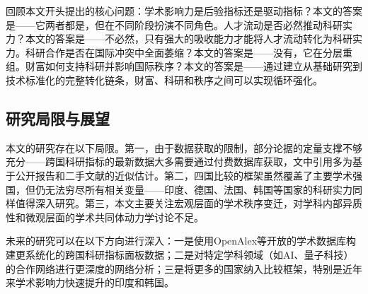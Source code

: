回顾本文开头提出的核心问题：学术影响力是后验指标还是驱动指标？本文的答案是——它两者都是，但在不同阶段扮演不同角色。人才流动是否必然推动科研实力？本文的答案是——不必然，只有强大的吸收能力才能将人才流动转化为科研实力。科研合作是否在国际冲突中全面萎缩？本文的答案是——没有，它在分层重组。财富如何支持科研并影响国际秩序？本文的答案是——通过建立从基础研究到技术标准化的完整转化链条，财富、科研和秩序之间可以实现循环强化。

\subsection*{研究局限与展望}

本文的研究存在以下局限。第一，由于数据获取的限制，部分论据的定量支撑不够充分——跨国科研指标的最新数据大多需要通过付费数据库获取，文中引用多为基于公开报告和二手文献的近似估计。第二，四国比较的框架虽然覆盖了主要学术强国，但仍无法穷尽所有相关变量——印度、德国、法国、韩国等国家的科研实力同样值得深入研究。第三，本文主要关注宏观层面的学术秩序变迁，对学科内部异质性和微观层面的学术共同体动力学讨论不足。

未来的研究可以在以下方向进行深入：一是使用OpenAlex等开放的学术数据库构建更系统化的跨国科研指标面板数据；二是对特定学科领域（如AI、量子科技）的合作网络进行更深度的网络分析；三是将更多的国家纳入比较框架，特别是近年来学术影响力快速提升的印度和韩国。
